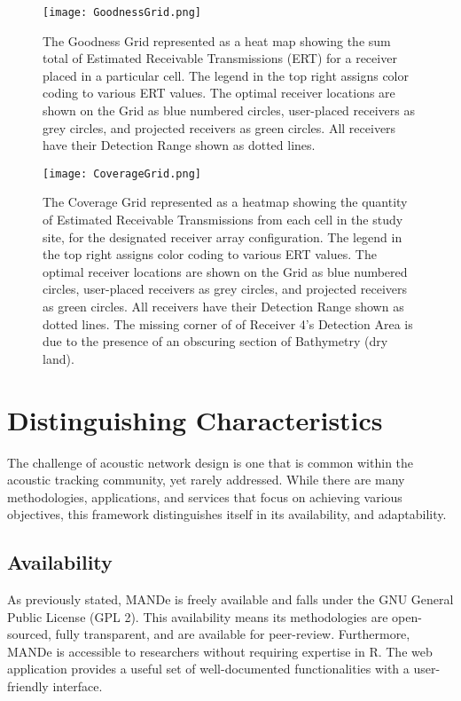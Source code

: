 \begin{figure}[ht]
	\texttt{[image: GoodnessGrid.png]}
	\caption{The Goodness Grid represented as a heat map showing the sum total of Estimated Receivable Transmissions (ERT) for a receiver placed in a particular cell.  The legend in the top right assigns color coding to various ERT values. The optimal receiver locations are shown on the Grid as blue numbered circles, user-placed receivers as grey circles, and projected receivers as green circles.  All receivers have their Detection Range shown as dotted lines.\label{GoodnessGraph}} 
\end{figure}

\begin{figure}[ht]
	\texttt{[image: CoverageGrid.png]}
	\caption{The Coverage Grid represented as a heatmap showing the quantity of Estimated Receivable Transmissions from each cell in the study site, for the designated receiver array configuration.  The legend in the top right assigns color coding to various ERT values.  The optimal receiver locations are shown on the Grid as blue numbered circles, user-placed receivers as grey circles, and projected receivers as green circles.  All receivers have their Detection Range shown as dotted lines.  The missing corner of of Receiver 4's Detection Area is due to the presence of an obscuring section of Bathymetry (dry land).\label{coverageGraph}}
\end{figure}
	
\section{Distinguishing Characteristics}
The challenge of acoustic network design is one that is common within the acoustic tracking community, yet rarely addressed.  While there are many methodologies, applications, and services that focus on achieving various objectives, this framework distinguishes itself in its availability, and adaptability.  

\subsection{Availability}
As previously stated, MANDe is freely available \cite{acousitcdeploy} and falls under the GNU General Public License (GPL 2).  This availability means its methodologies are open-sourced, fully transparent, and are available for peer-review.  Furthermore, MANDe is accessible to researchers without requiring expertise in R.  The web application provides a useful set of well-documented functionalities with a user-friendly interface.

